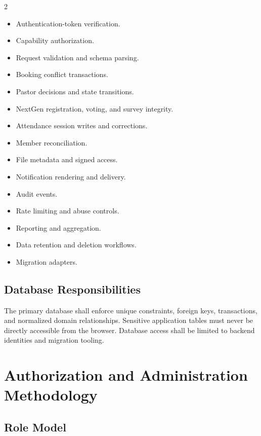 \documentclass[11pt,a4paper,oneside]{report}
\begin{document}
\begin{multicols}{2}
\begin{itemize}
  \item Authentication-token verification.
  \item Capability authorization.
  \item Request validation and schema parsing.
  \item Booking conflict transactions.
  \item Pastor decisions and state transitions.
  \item NextGen registration, voting, and survey integrity.
  \item Attendance session writes and corrections.
  \item Member reconciliation.
  \item File metadata and signed access.
  \item Notification rendering and delivery.
  \item Audit events.
  \item Rate limiting and abuse controls.
  \item Reporting and aggregation.
  \item Data retention and deletion workflows.
  \item Migration adapters.
\end{itemize}
\end{multicols}

\section{Database Responsibilities}

The primary database shall enforce unique constraints, foreign keys, transactions, and normalized domain relationships. Sensitive application tables must never be directly accessible from the browser. Database access shall be limited to backend identities and migration tooling.

\chapter{Authorization and Administration Methodology}

\section{Role Model}
\end{document}
